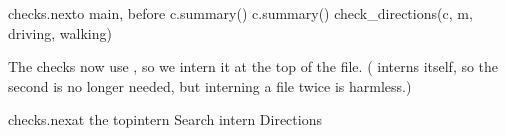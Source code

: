 \begin{tightaddbefore}{checks.nex}{to main, before c.summary()}{  c.summary()}
  check_directions(c, m, driving, walking)
\end{tightaddbefore}

The checks now use , so we intern it at the top of the
file. ( interns  itself, so the
second  is no longer needed, but interning a file twice is
harmless.)

\begin{tightaddbefore}{checks.nex}{at the top}{intern Search}
intern Directions
\end{tightaddbefore}
